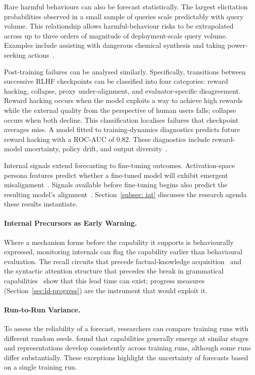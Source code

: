 Rare harmful behaviours can also be forecast statistically. The largest elicitation probabilities observed in a small sample of queries scale predictably with query volume. This relationship allows harmful-behaviour risks to be extrapolated across up to three orders of magnitude of deployment-scale query volume. Examples include assisting with dangerous chemical synthesis and taking power-seeking actions~.

Post-training failures can be analysed similarly. Specifically, transitions between successive RLHF checkpoints can be classified into four categories: reward hacking, collapse, proxy under-alignment, and evaluator-specific disagreement. Reward hacking occurs when the model exploits a way to achieve high rewards while the external quality from the perspective of human users falls; collapse occurs when both decline. This classification localises failures that checkpoint averages miss. A model fitted to training-dynamics diagnostics predicts future reward hacking with a ROC-AUC of 0.82. These diagnostics include reward-model uncertainty, policy drift, and output diversity~.

Internal signals extend forecasting to fine-tuning outcomes. Activation-space persona features predict whether a fine-tuned model will exhibit emergent misalignment~. Signals available before fine-tuning begins also predict the resulting model’s alignment~. Section~\ref{subsec: iat} discusses the research agenda these results instantiate.

\paragraph{Internal Precursors as Early Warning.} Where a mechanism forms before the capability it supports is behaviourally expressed, monitoring internals can flag the capability earlier than behavioural evaluation. The recall circuits that precede factual-knowledge acquisition~ and the syntactic attention structure that precedes the break in grammatical capabilities~ show that this lead time can exist; progress measures (Section~\ref{sec:ld-progress}) are the instrument that would exploit it.

\paragraph{Run-to-Run Variance.} To assess the reliability of a forecast, researchers can compare training runs with different random seeds.  found that capabilities generally emerge at similar stages and representations develop consistently across training runs, although some runs differ substantially. These exceptions highlight the uncertainty of forecasts based on a single training run.

